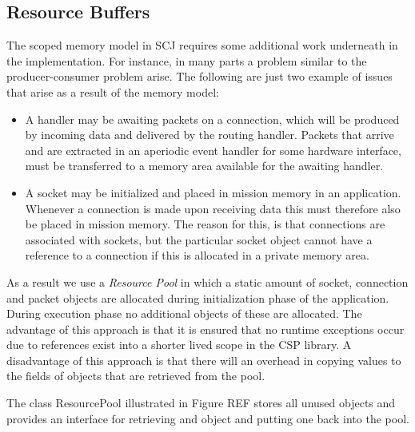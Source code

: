 \subsection{Resource Buffers}
The scoped memory model in SCJ requires some additional work underneath in the implementation. For instance, in many parts a problem similar to the producer-consumer problem arise. The following are just two example of issues that arise as a result of the memory model:
\begin{itemize}
	\item A handler may be awaiting packets on a connection, which will be produced by incoming data and delivered by the routing handler. Packets that arrive and are extracted in an aperiodic event handler for some hardware interface, must be transferred to a memory area available for the awaiting handler.
	\item A socket may be initialized and placed in mission memory in an application. Whenever a connection is made upon receiving data this must therefore also be placed in mission memory. The reason for this, is that connections are associated with sockets, but the particular socket object cannot have a reference to a connection if this is allocated in a private memory area.
\end{itemize}

As a result we use a \textit{Resource Pool}\cite{Rios:2012:PSJ:2388936.2388938} in which a static amount of socket, connection and packet objects are allocated during initialization phase of the application. During execution phase no additional objects of these are allocated. The advantage of this approach is that it is ensured that no runtime exceptions occur due to references exist into a shorter lived scope in the CSP library. A disadvantage of this approach is that there will an overhead in copying values to the fields of objects that are retrieved from the pool.

The class ResourcePool illustrated in Figure REF stores all unused objects and provides an interface for retrieving and object and putting one back into the pool.
